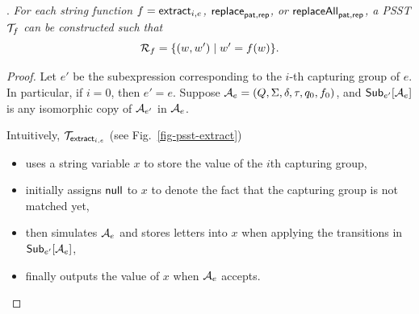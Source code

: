 


    \medskip

    . 
    \emph{For each string function $f = \mathsf{extract}_{i,e}$, $\mathsf{replace}_{\mathsf{pat}, \mathsf{rep}}$, or $\mathsf{replaceAll}_{\mathsf{pat}, \mathsf{rep}}$, a PSST $\mathcal{T}_f$ can be constructed such that 
    $$\mathcal{R}_{f} = \{(w, w') \mid w'= f(w)\}.$$}

    \begin{proof}
        Let $e'$ be the subexpression corresponding to the $i$-th capturing group of $e$. In particular, if $i=0$, then $e' = e$. 
        Suppose $\mathcal{A}_e = (Q, \Sigma, \delta, \tau, q_0, f_0)$, and ${\sf Sub}_{e'}[\mathcal{A}_e]$ is any isomorphic copy of $\mathcal{A}_{e'}$ in $\mathcal{A}_e$.

        Intuitively, $\mathcal{T}_{\mathsf{extract}_{i,e}}$ (see Fig.~\ref{fig-psst-extract})
        \begin{itemize}
            \item uses a string variable $x$ to store the value of the $i$th capturing group,
            \item initially assigns $\mathsf{null}$ to $x$ to denote the fact that the capturing group is not matched yet,
            \item then simulates $\mathcal{A}_e$ and stores letters into $x$ when applying the transitions in ${\sf Sub}_{e'}[\mathcal{A}_e]$,
            \item finally outputs the value of $x$ when $\mathcal{A}_e$ accepts.
        \end{itemize}


\end{proof}
